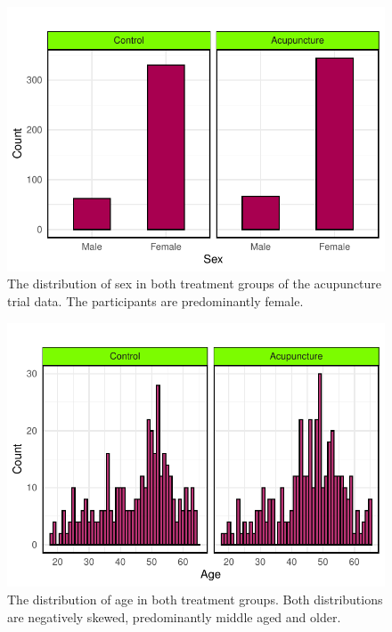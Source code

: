 \documentclass{article}
\begin{document}
\begin{figure}

{\centering \includegraphics{Final_Report_files/figure-latex/unnamed-chunk-9-1} 

}

\caption{The distribution of sex in both treatment groups of the acupuncture trial data. The participants are predominantly female.}\label{fig:unnamed-chunk-9}
\end{figure}

\begin{figure}

{\centering \includegraphics{Final_Report_files/figure-latex/unnamed-chunk-10-1} 

}

\caption{The distribution of age in both treatment groups. Both distributions are negatively skewed, predominantly middle aged and older.}\label{fig:unnamed-chunk-10}
\end{figure}
\end{document}

